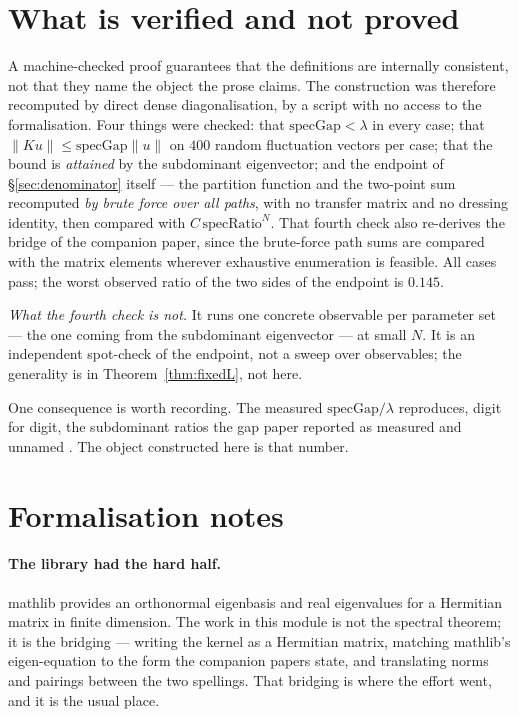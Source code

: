 \documentclass[11pt]{article}
\theoremstyle{definition}
\begin{document}
\section{What is verified and not proved}\label{sec:verified}

A machine-checked proof guarantees that the definitions are internally
consistent, not that they name the object the prose claims.  The construction was
therefore recomputed by direct dense diagonalisation, by a script with no access
to the formalisation.  Four things were checked: that
$\mathrm{specGap} < \lambda$ in every case; that
$\|Ku\|\le \mathrm{specGap}\|u\|$ on $400$ random fluctuation vectors per case;
that the bound is \emph{attained} by the subdominant eigenvector; and the
endpoint of §\ref{sec:denominator} itself --- the partition function and the
two-point sum recomputed \emph{by brute force over all paths}, with no transfer
matrix and no dressing identity, then compared with
$C\,\mathrm{specRatio}^{N}$.  That fourth check also re-derives the bridge of
the companion paper, since the brute-force path sums are compared with the
matrix elements wherever exhaustive enumeration is feasible.  All cases pass;
the worst observed ratio of the two sides of the endpoint is $0.145$.

\emph{What the fourth check is not.}  It runs one concrete observable per
parameter set --- the one coming from the subdominant eigenvector --- at small
$N$.  It is an independent spot-check of the endpoint, not a sweep over
observables; the generality is in Theorem~\ref{thm:fixedL}, not here.

One consequence is worth recording.  The measured $\mathrm{specGap}/\lambda$
reproduces, digit for digit, the subdominant ratios the gap paper reported as
measured and unnamed \cite{ErikssonGap}.  The object constructed here is that
number.

\section{Formalisation notes}\label{sec:formal}

\paragraph{The library had the hard half.}  mathlib provides an orthonormal
eigenbasis and real eigenvalues for a Hermitian matrix in finite dimension.  The
work in this module is not the spectral theorem; it is the bridging --- writing
the kernel as a Hermitian matrix, matching mathlib's eigen-equation to the form
the companion papers state, and translating norms and pairings between the two
spellings.  That bridging is where the effort went, and it is the usual place.
\end{document}
